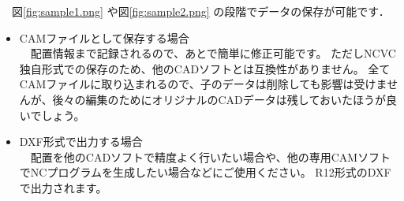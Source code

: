 

\vspace*{1zh}
　図\ref{fig:sample1.png} や図\ref{fig:sample2.png} の段階でデータの保存が可能です．

\begin{itemize}
\item CAMファイルとして保存する場合\\
　配置情報まで記録されるので、あとで簡単に修正可能です。
ただしNCVC独自形式での保存のため、他のCADソフトとは互換性がありません。
全てCAMファイルに取り込まれるので、子のデータは削除しても影響は受けませんが、後々の編集のためにオリジナルのCADデータは残しておいたほうが良いでしょう。
\item DXF形式で出力する場合\\
　配置を他のCADソフトで精度よく行いたい場合や、他の専用CAMソフトでNCプログラムを生成したい場合などにご使用ください。
R12形式のDXFで出力されます。
\end{itemize}